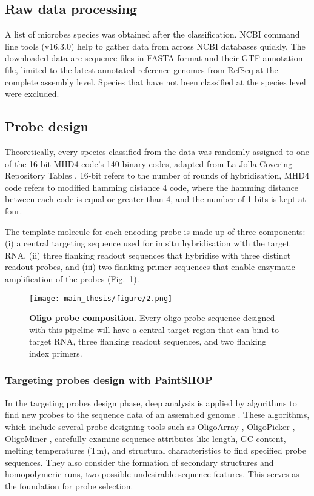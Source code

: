 \documentclass[10pt,letterpaper]{article}
\begin{document}
\subsection*{Raw data processing}
A list of microbes species was obtained after the classification. NCBI command line tools (v16.3.0)\parencite{ncbi2024} help to gather data from across NCBI databases quickly. The downloaded data are sequence files in FASTA format and their GTF annotation file, limited to the latest annotated reference genomes from RefSeq at the complete assembly level. Species that have not been classified at the species level were excluded. 
\subsection*{Probe design}
Theoretically, every species classified from the data was randomly assigned to one of the 16-bit MHD4 code’s 140 binary codes, adapted from La Jolla Covering Repository Tables \parencite{gordon2024lajolla}. 16-bit refers to the number of rounds of hybridisation, MHD4 code refers to modified hamming distance 4 code, where the hamming distance between each code is equal or greater than 4, and the number of 1 bits is kept at four.

\noindent The template molecule for each encoding probe is made up of three components: (i) a central targeting sequence used for in situ hybridisation with the target RNA, (ii) three flanking readout sequences that hybridise with three distinct readout probes, and (iii) two flanking primer sequences that enable enzymatic amplification of the probes (Fig.~\ref{fig2}).
\newline
\begin{figure}[H] %
    \centering
    \caption{\textbf{Oligo probe composition.} Every oligo probe sequence designed with this pipeline will have a central target region that can bind to target RNA, three flanking readout sequences, and two flanking index primers.}
    \centering
    \texttt{[image: main\_thesis/figure/2.png]} 
    \label{fig2}
\end{figure}
\subsubsection*{Targeting probes design with PaintSHOP}
In the targeting probes design phase, deep analysis is applied by algorithms to find new probes to the sequence data of an assembled genome \parencite{beliveau-2018}. These algorithms, which include several probe designing tools such as OligoArray \parencite{rouillard-2003}, OligoPicker \parencite{wang-2003}, OligoMiner \parencite{beliveau-2018}, carefully examine sequence attributes like length, GC content, melting temperatures (Tm), and structural characteristics to find specified probe sequences. They also consider the formation of secondary structures and homopolymeric runs, two possible undesirable sequence features. This serves as the foundation for probe selection.
\end{document}
